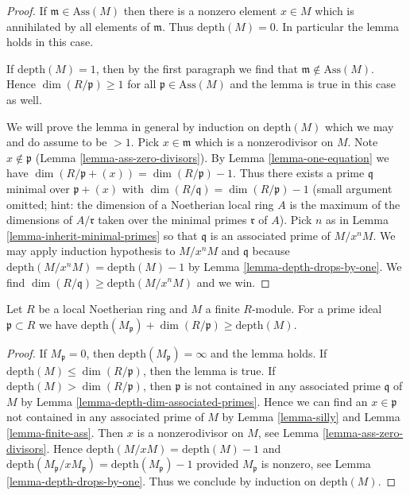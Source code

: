 \begin{proof}
If $\mathfrak m \in \text{Ass}(M)$ then there is a nonzero element
$x \in M$ which is annihilated by all elements of $\mathfrak m$.
Thus $\text{depth}(M) = 0$. In particular the lemma holds in this case.

\medskip\noindent
If $\text{depth}(M) = 1$, then by the first paragraph
we find that $\mathfrak m \not \in \text{Ass}(M)$.
Hence $\dim(R/\mathfrak p) \geq 1$ for all $\mathfrak p \in \text{Ass}(M)$
and the lemma is true in this case as well.

\medskip\noindent
We will prove the lemma in general by induction on $\text{depth}(M)$
which we may and do assume to be $> 1$. Pick $x \in \mathfrak m$ which
is a nonzerodivisor on $M$. Note $x \not \in \mathfrak p$
(Lemma \ref{lemma-ass-zero-divisors}).
By Lemma \ref{lemma-one-equation} we have
$\dim(R/\mathfrak p + (x)) = \dim(R/\mathfrak p) - 1$.
Thus there exists a prime $\mathfrak q$ minimal over $\mathfrak p + (x)$ with
$\dim(R/\mathfrak q) = \dim(R/\mathfrak p) - 1$ (small argument omitted;
hint: the dimension of a Noetherian local ring $A$ is the maximum
of the dimensions of $A/\mathfrak r$ taken over the minimal
primes $\mathfrak r$ of $A$). Pick $n$ as in
Lemma \ref{lemma-inherit-minimal-primes} so that
$\mathfrak q$ is an associated prime of $M/x^nM$.
We may apply induction hypothesis to $M/x^nM$ and $\mathfrak q$
because $\text{depth}(M/x^nM) = \text{depth}(M) - 1$ by
Lemma \ref{lemma-depth-drops-by-one}. We find
$\dim(R/\mathfrak q) \geq \text{depth}(M/x^nM)$ and we win.
\end{proof}

\begin{lemma}
\label{lemma-depth-localization}
Let $R$ be a local Noetherian ring and $M$ a finite $R$-module.
For a prime ideal $\mathfrak p \subset R$ we have
$\text{depth}(M_\mathfrak p) + \dim(R/\mathfrak p) \geq \text{depth}(M)$.
\end{lemma}

\begin{proof}
If $M_\mathfrak p = 0$, then $\text{depth}(M_\mathfrak p) = \infty$ and
the lemma holds.
If $\text{depth}(M) \leq \dim(R/\mathfrak p)$, then the lemma is true.
If $\text{depth}(M) > \dim(R/\mathfrak p)$, then $\mathfrak p$ is not
contained in any associated prime $\mathfrak q$ of $M$ by
Lemma \ref{lemma-depth-dim-associated-primes}.
Hence we can find an $x \in \mathfrak p$ not contained in any
associated prime of $M$ by Lemma \ref{lemma-silly} and
Lemma \ref{lemma-finite-ass}. Then $x$ is a nonzerodivisor
on $M$, see Lemma \ref{lemma-ass-zero-divisors}.
Hence $\text{depth}(M/xM) = \text{depth}(M) - 1$ and
$\text{depth}(M_\mathfrak p / x M_\mathfrak p) =
\text{depth}(M_\mathfrak p) - 1$ provided $M_\mathfrak p$ is nonzero,
see Lemma \ref{lemma-depth-drops-by-one}.
Thus we conclude by induction on $\text{depth}(M)$.
\end{proof}

